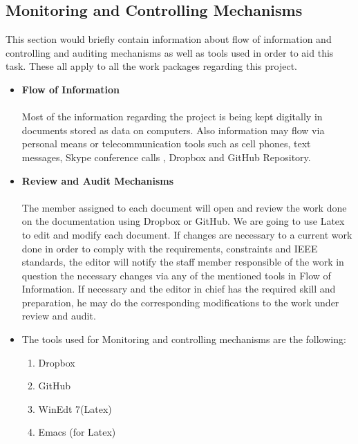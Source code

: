 \documentclass[12pt]{article}
\begin{document}
\subsection{Monitoring and Controlling Mechanisms}
This section would briefly contain information about flow of information and controlling and auditing mechanisms as well as tools used in order to aid this task. These all apply to all the work packages regarding this project. 
\begin{itemize}
  \item \textbf{Flow of Information}\\\\
  Most of the information regarding the project is being kept digitally in documents stored as data on computers. Also information may flow via personal means or telecommunication tools such as cell phones, text messages, Skype conference calls , Dropbox  and GitHub Repository.
  \item \textbf{Review and Audit Mechanisms}\\\\
  The member assigned to each document will open and review the work done on the documentation using Dropbox or GitHub. We are going to use Latex to edit and modify each document. If changes are necessary to a current work done in order to comply with the requirements, constraints and IEEE standards, the editor will notify the staff member responsible of the work in question the necessary changes via any of the mentioned tools in Flow of Information. If necessary and the editor in chief has the required skill and preparation, he may do the corresponding modifications to the work under review and audit.
  \item The tools used for Monitoring and controlling mechanisms are the following:
      \begin{enumerate}
        \item Dropbox
        \item GitHub
        \item WinEdt 7(Latex) 
        \item Emacs (for Latex)
      \end{enumerate}
\end{itemize}
\end{document}
